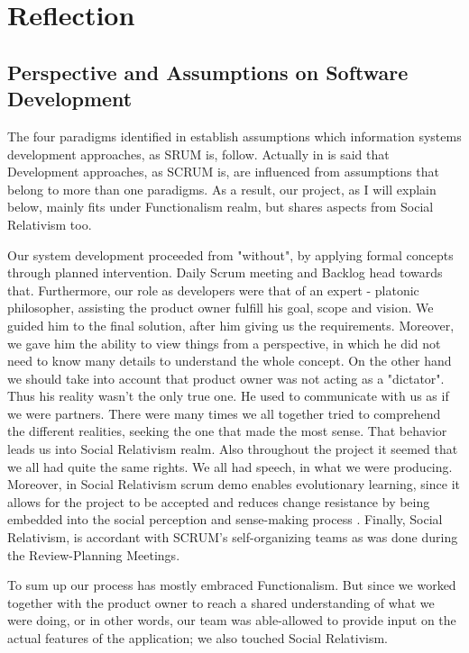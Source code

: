 \section{Reflection}

\subsection{Perspective and Assumptions on Software Development}

The four paradigms identified in \cite{Refl} establish assumptions which information systems development approaches, as SRUM is, follow. Actually in \cite{Refl} is said that Development approaches, as SCRUM is, are influenced from assumptions that belong to more than one paradigms. As a result, our project, as I will explain below, mainly fits under Functionalism realm, but shares aspects from Social Relativism too.

Our system development proceeded from "without", by applying formal concepts through planned intervention. Daily Scrum meeting and Backlog head towards that. Furthermore, our role as developers were that of an expert - platonic philosopher, assisting the product owner fulfill his goal, scope and vision. We guided him to the final solution, after him giving us the requirements. Moreover, we gave him the ability to view things from a perspective, in which he did not need to know many details to understand the whole concept.
On the other hand we should take into account that product owner was not acting as a "dictator". Thus his reality wasn’t the only true one. He used to communicate with us as if we were partners. There were many times we all together tried to comprehend the different realities, seeking the one that made the most sense. That behavior leads us into Social Relativism realm. Also throughout the project  it seemed that we all had quite the same rights. We all had speech, in what we were producing. Moreover, in Social Relativism scrum demo enables evolutionary learning, since it allows for the project to be accepted and reduces change resistance by being embedded into the social perception and sense-making process \cite{Refl}. Finally, Social Relativism, is accordant with SCRUM's self-organizing teams as was done during the Review-Planning Meetings.

To sum up our process has mostly embraced Functionalism. But since we worked together with the product owner to reach a shared understanding of what we were doing, or in other words, our team was able-allowed to provide input on the actual features of the application; we also touched Social Relativism.

